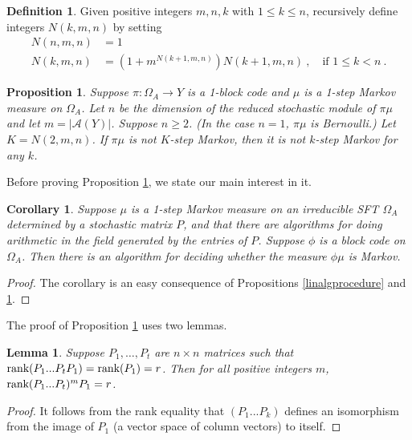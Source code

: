 \documentclass{kepart2010}
\theoremstyle{plain}
\newtheorem{cor}[thm]{Corollary}
\newtheorem{lem}[thm]{Lemma}
\newtheorem{prop}[thm]{Proposition}
\theoremstyle{definition}
\newtheorem{defn}[thm]{Definition}
\theoremstyle{remark}
\theoremstyle{definition}
\numberwithin{equation}{section}
\begin{document}
\begin{defn} Given positive integers $m,n,k$ with $1\leq k \leq n$,
recursively define integers $N(k,m,n)$ by setting
\begin{align}
N(n,m,n) &= 1  \\
N(k,m,n) &= (1+m^{N(k+1,m,n)})N(k+1,m,n)\ ,
\quad \text{if } 1\leq k < n \ .
\end{align}
\end{defn}

\begin{prop}\label{prop_stepbound}
Suppose $\pi:\Omega_A \to Y$ is a 1-block code and $\mu$ is a 1-step
Markov measure on $\Omega_A$. Let $n$ be the dimension of the
reduced stochastic module of $\pi \mu$ and let $m=|\mathcal A(Y)|$.
Suppose $n\geq 2$.
  (In the case $n=1$, $\pi \mu$ is Bernoulli.) Let
$K=N(2,m,n)$. If $\pi \mu$
 is not $K$-step Markov, then it is not $k$-step Markov for
any $k$.
\end{prop}

Before proving Proposition \ref{prop_stepbound},
 we state our main interest in it.

\begin{cor} \label{cor_markovalgorithm}
Suppose $\mu$ is a 1-step Markov measure on an irreducible SFT
$\Omega_A$ determined by a stochastic matrix $P$, and that there are
algorithms for doing arithmetic in the field generated by the
entries of $P$. Suppose  $\phi$ is a block code on $\Omega_A$. Then
there is an algorithm for deciding whether the measure $\phi \mu$ is
Markov.
\end{cor}
\begin{proof}
The corollary is an easy consequence of
Propositions  \ref{linalgprocedure} and
\ref{prop_stepbound}.
\end{proof}

The proof of Proposition \ref{prop_stepbound} uses two lemmas.

\begin{lem}\label{lem_prodrank}
    Suppose $P_1, \dots ,P_t$ are $n \times n$ matrices such that
 $\textnormal{rank}
(P_1 ... P_tP_1)= \textnormal{rank} (P_1) = r$. Then for all
positive
integers $m$,
 $\textnormal{rank}
(P_1 ... P_t)^mP_1= r$.
\end{lem}
\begin{proof}
It follows from  the rank equality that
$(P_1...P_k)$ defines an isomorphism
from the image of $P_1$ (a vector space of column vectors)
to itself.
\end{proof}
\end{document}
